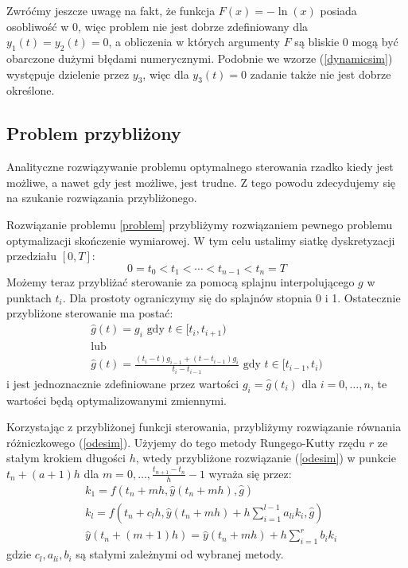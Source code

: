 \documentclass[11pt]{article}
\begin{document}
Zwróćmy jeszcze uwagę na fakt, że funkcja $F(x) = -\ln(x)$ posiada osobliwość w 0, więc problem nie jest dobrze zdefiniowany dla $y_1(t) = y_2(t) = 0$, a obliczenia w których argumenty $F$ są bliskie 0 mogą być obarczone dużymi błędami numerycznymi. Podobnie we wzorze (\ref{dynamicsim}) występuje dzielenie przez $y_3$, więc dla $y_3(t) = 0$ zadanie także nie jest dobrze określone.

\subsection{Problem przybliżony}
Analityczne rozwiązywanie problemu optymalnego sterowania rzadko kiedy jest możliwe, a nawet gdy jest możliwe, jest trudne. Z tego powodu zdecydujemy się na szukanie rozwiązania przybliżonego.

Rozwiązanie problemu \ref{problem} przybliżymy rozwiązaniem pewnego problemu optymalizacji skończenie wymiarowej. W tym celu ustalimy siatkę dyskretyzacji przedziału $[0, T]$:
\begin{equation}
  0 = t_0 < t_1 < \cdots < t_{n-1} < t_n = T
\end{equation}
Możemy teraz przybliżać sterowanie za pomocą splajnu interpolującego $g$ w punktach $t_{i}$. Dla prostoty ograniczymy się do splajnów stopnia 0 i 1. Ostatecznie przybliżone sterowanie ma postać:
\begin{gather}  
    \hat{g}(t) = g_i \text{ gdy } t \in [t_{i}, t_{i + 1}) \label{control_1}\\
    \nonumber \text{lub} \\
    \hat{g}(t) = \frac{(t_i - t)g_{i-1} + (t - t_{i-1})g_{i}}{t_i - t_{i-1}} \text{ gdy } t \in [t_{i-1}, t_i) \label{control_2}
\end{gather}
i jest jednoznacznie zdefiniowane przez wartości $g_i = \hat{g}(t_i)$ dla $i = 0,\ldots, n$, te wartości będą optymalizowanymi zmiennymi.

Korzystając z przybliżonej funkcji sterowania, przybliżymy rozwiązanie równania różniczkowego (\ref{odesim}). Użyjemy do tego metody Rungego-Kutty rzędu $r$ ze stałym krokiem długości $h$, wtedy przybliżone rozwiązanie (\ref{odesim}) w punkcie $t_n + (a + 1)h$ dla $m = 0,\ldots, \frac{t_{n+1}-t_n}{h} - 1$  wyraża się przez:
\begin{equation} \label{rk}
  \begin{split}
    &k_1 = f(t_n + mh, \hat{y}(t_n + mh), \hat{g}) \\
    &k_l = f(t_n + c_l h, \hat{y}(t_n + mh) + h \sum_{i = 1}^{l-1} a_{li}k_i, \hat{g}) \\
    &\hat{y}(t_n + (m+1)h) = \hat{y}(t_n + mh) + h \sum_{i = 1}^r b_i k_i
  \end{split}
\end{equation}
gdzie $c_l, a_{li}, b_i$ są stałymi zależnymi od wybranej metody.
\end{document}
